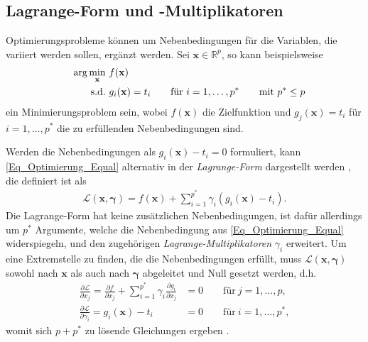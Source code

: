 \documentclass[12pt, a4paper]{report}\usepackage[]{graphicx}\usepackage[]{color}
\begin{document}
\begin{appendix}
\section{Lagrange-Form und -Multiplikatoren}\label{App_Lagrange-Form}
Optimierungsprobleme können um Nebenbedingungen für die Variablen, die variiert werden sollen, ergänzt werden. Sei $\mathbf{x} \in \mathbb{R}^p$, so kann beispielsweise
\begin{align}\label{Eq_Optimierung_Equal}
&&\arg \displaystyle\min_{\mathbf{x}} \ & f(\mathbf{x}) \notag \\ 
&&\text{s.d.} \ & g_i(\mathbf{x})=t_i \qquad \text{für} \  i=1,\dots,p^* \qquad \text{mit} \ p^* \le p
\end{align}
ein Minimierungsproblem sein, wobei $f(\mathbf{x})$ die Zielfunktion und $g_j(\mathbf{x})=t_i$ für $i=1,\dots,p^*$ die zu erfüllenden Nebenbedingungen sind. 
\begin{comment}Es muss stets $p^* < p$ gelten, da ansonsten die Lösung für das Optimierungsproblem durch die Bedingungen nicht eingeschränkt, sondern bestimmt wäre.
\end{comment}
Werden die Nebenbedingungen als $g_i(\mathbf{x})-t_i=0$ formuliert, kann \eqref{Eq_Optimierung_Equal} alternativ in der \textit{Lagrange-Form} dargestellt werden \cite{haftka1992elements}, die definiert ist als
\begin{align}\label{Eq_lagrange_Allgemein}
\mathcal{L}(\mathbf{x},\boldsymbol{\gamma})=f(\mathbf{x})+ \sum_{i=1}^{p^*}\gamma_i (g_i(\mathbf{x})-t_i).
\end{align}
Die Lagrange-Form hat keine zusätzlichen Nebenbedingungen, ist dafür allerdings um $p^*$ Argumente, welche die Nebenbedingung aus \eqref{Eq_Optimierung_Equal} widerspiegeln, und den zugehörigen \textit{Lagrange-Multiplikatoren} $\gamma_i$ erweitert. Um eine Extremstelle zu finden, die die Nebenbedingungen erfüllt, muss $\mathcal{L}(\mathbf{x},\boldsymbol{\gamma})$ sowohl nach $\mathbf{x}$ als auch nach $\boldsymbol{\gamma}$ abgeleitet und Null gesetzt werden, d.h.
\begin{align*}
\frac{\partial \mathcal{L}}{\partial x_j}=\frac{\partial f}{\partial x_j} + \sum_{i=1}^{p^*}\gamma_i \frac{\partial g_i}{\partial x_j}&=0 \qquad \text{für} \ j=1,\dots,p , \\ 
\frac{\partial \mathcal{L}}{\partial \gamma_i}=g_i(\mathbf{x})-t_i&=0 \qquad \text{für} \ i=1,\dots,p^* ,
\end{align*}
womit sich $p+p^*$ zu lösende Gleichungen ergeben \cite{strang1991calculus}.\\

\end{appendix}
\end{document}
